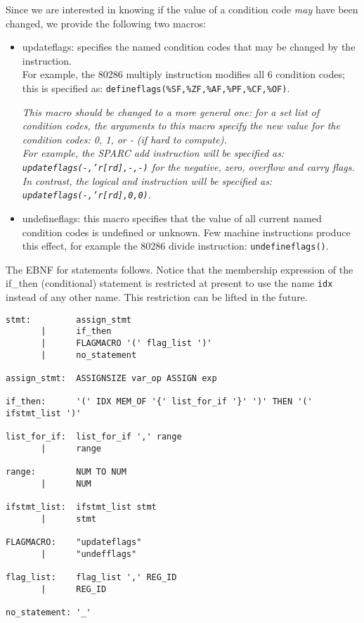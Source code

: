 Since we are interested in knowing if the value of a condition code 
\emph{may} have been changed, we provide the following two macros:
\begin{itemize}
\item updateflags: specifies the named condition codes that may
	be changed by the instruction.  \\
	For example, the 80286 multiply instruction modifies all 6
	condition codes; this is specified as:
	\verb!defineflags(%SF,%ZF,%AF,%PF,%CF,%OF)!.

	{\it
	This macro should be changed to a more general one:
	for a set list of condition codes, the arguments
	to this macro specify the new value for the condition codes:
	0, 1, or - (if hard to compute). \\
	For example, the SPARC add instruction will be specified as: 
	\texttt{updateflags(-,'r[rd],-,-)} for the negative, zero, 
	overflow and carry flags.  
	In contrast, the logical and instruction will be specified as:
	\texttt{updateflags(-,'r[rd],0,0)}. 
	}

\item undefineflags: this macro specifies that the value of all current 
	named condition codes is undefined or unknown.  Few 
	machine instructions produce this effect, for example the
	80286 divide instruction:
	\texttt{undefineflags()}. 
\end{itemize}
 
The EBNF for statements follows.  Notice that the membership
expression of the if\_then (conditional) statement is restricted
at present to use the name \texttt{idx} instead of any other
name.  This restriction can be lifted in the future.
{\small
\begin{verbatim}
stmt:         assign_stmt
       |      if_then
       |      FLAGMACRO '(' flag_list ')'
       |      no_statement

assign_stmt:  ASSIGNSIZE var_op ASSIGN exp
 
if_then:      '(' IDX MEM_OF '{' list_for_if '}' ')' THEN '(' ifstmt_list ')'
 
list_for_if:  list_for_if ',' range
       |      range
 
range:        NUM TO NUM
       |      NUM
 
ifstmt_list:  ifstmt_list stmt
       |      stmt

FLAGMACRO:    "updateflags"
       |      "undefflags"

flag_list:    flag_list ',' REG_ID
       |      REG_ID

no_statement: '_'
\end{verbatim}
}

